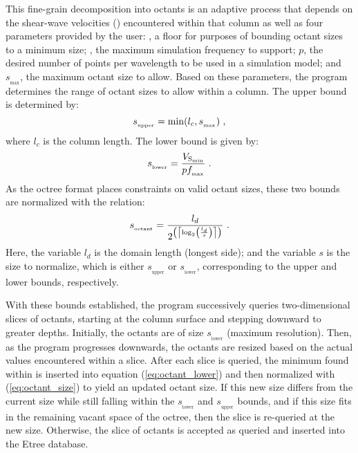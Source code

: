 This fine-grain decomposition into octants is an adaptive process that depends on the shear-wave velocities (\vs{}) encountered within that column as well as four parameters provided by the user: \vsmin{}, a floor \vs{} for purposes of bounding octant sizes to a minimum size; \fmax{}, the maximum simulation frequency to support; $p$, the desired number of points per wavelength to be used in a simulation model; and $s_{_{\max}}$, the maximum octant size to allow. Based on these parameters, the program determines the range of octant sizes to allow within a column. The upper bound is determined by:
%
\begin{equation}
\label{eq:octant_upper}
	s_{_{\mathrm{upper}}} = \min ( l_c, s_{_{\max}} )
	\hspace{0.3em},
\end{equation}
%
where $l_c$ is the column length. The lower bound is given by:
%
\begin{equation}
\label{eq:octant_lower}
	s_{_{\mathrm{lower}}} = \frac{ V_{\mathrm{S}_{\min}} }{ p f_{_{\max}}}
	\hspace{0.3em}.
\end{equation}
%
As the octree format places constraints on valid octant sizes, these two bounds are normalized with the relation:
%
\begin{equation}
\label{eq:octant_size}
	s_{_{\mathrm{octant}}} = \frac{ l_d }{ 2^{ \left( \left\lceil \log_{2} \left( \frac{l_d}{s} \right) \right\rceil \right)} }
	\hspace{0.3em}.
\end{equation}
%
Here, the variable $l_d$ is the domain length (longest side); and the variable $s$ is the size to normalize, which is either $s_{_{\mathrm{upper}}}$ or $s_{_{\mathrm{lower}}}$, corresponding to the upper and lower bounds, respectively.

With these bounds established, the program successively queries two-dimensional slices of octants, starting at the column surface and stepping downward to greater depths. Initially, the octants are of size $s_{_{\mathrm{lower}}}$ (maximum resolution). Then, as the program progresses downwards, the octants are resized based on the actual \vs{} values encountered within a slice. After each slice is queried, the minimum \vs{} found within is inserted into equation (\ref{eq:octant_lower}) and then normalized with (\ref{eq:octant_size}) to yield an updated octant size. If this new size differs from the current size while still falling within the $s_{_{\mathrm{lower}}}$ and $s_{_{\mathrm{upper}}}$ bounds, and if this size fits in the remaining vacant space of the octree, then the slice is re-queried at the new size. Otherwise, the slice of octants is accepted as queried and inserted into the Etree database.

